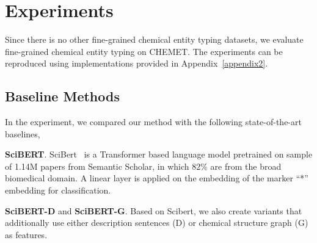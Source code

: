 \section{Experiments}
\label{sec:experiment}
Since there is no other fine-grained chemical entity typing datasets, we evaluate fine-grained chemical entity typing on CHEMET. The experiments can be reproduced using implementations provided in Appendix~\ref{appendix2}.
\subsection{Baseline Methods}
 In the experiment, we compared our method with the following state-of-the-art baselines,

\noindent \textbf{SciBERT}. SciBert~\cite{scibert} is a Transformer based language model pretrained on sample of 1.14M papers from Semantic Scholar, in which 82\% are from the broad biomedical domain. A linear layer is applied on the embedding of the marker ``*'' embedding for classification.

\noindent \textbf{SciBERT-D} and \textbf{SciBERT-G}. Based on Scibert, we also create variants that additionally use either description sentences (D) or chemical structure graph (G) as features.


